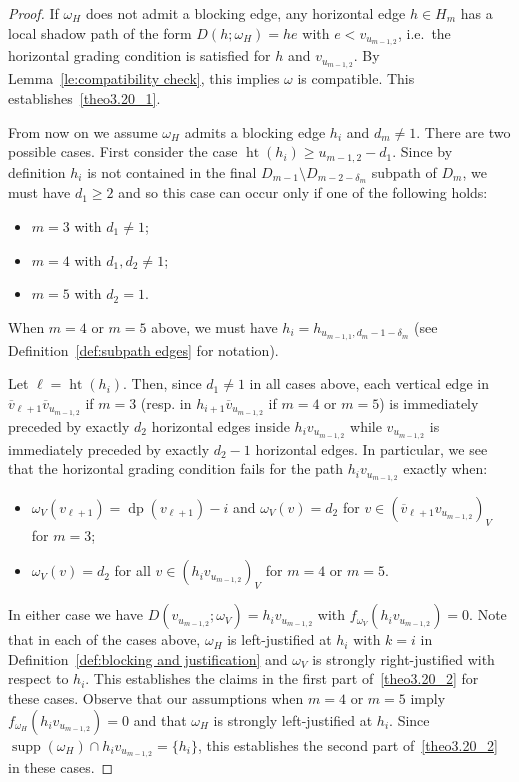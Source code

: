\documentclass[10pt]{amsart}
\theoremstyle{definition}
\newcommand{\ie}{i.e.\ }
\DeclareMathOperator{\hgt}{ht}
\DeclareMathOperator{\dpt}{dp}
\DeclareMathOperator{\supp}{supp}
\begin{document}
\begin{proof}
 If $\omega_H$ does not admit a blocking edge, any horizontal edge $h\in H_m$ has a local shadow path of the form $D(h;\omega_H)=he$ with $e<v_{u_{m-1,2}}$, \ie the horizontal grading condition is satisfied for $h$ and $v_{u_{m-1,2}}$. By Lemma~\ref{le:compatibility check}, this implies $\omega$ is compatible. 
 This establishes~\ref{theo3.20_1}. 
 
 From now on we assume $\omega_H$ admits a blocking edge $h_i$ and $d_m\ne1$. 
 There are two possible cases.
 First consider the case $\hgt(h_i)\ge u_{m-1,2}-d_1$.
 Since by definition $h_i$ is not contained in the final $D_{m-1}\setminus D_{m-2-\delta_m}$ subpath of $D_m$, we must have $d_1\ge2$ and so this case can occur only if one of the following holds:
 \begin{itemize}
 \item $m=3$ with $d_1\ne1$;
 \item $m=4$ with $d_1,d_2\ne1$;
 \item $m=5$ with $d_2=1$.
 \end{itemize}
 When $m=4$ or $m=5$ above, we must have $h_i=h_{u_{m-1,1},d_m-1-\delta_m}$ (see Definition~\ref{def:subpath edges} for notation).

 Let $\ell=\hgt(h_i)$.
 Then, since $d_1\ne1$ in all cases above, each vertical edge in $\overline{v}_{\ell+1}\overline{v}_{u_{m-1,2}}$ if $m=3$ (resp. in $h_{i+1}\overline{v}_{u_{m-1,2}}$ if $m=4$ or $m=5$) is immediately preceded by exactly $d_2$ horizontal edges inside $h_iv_{u_{m-1,2}}$ while $v_{u_{m-1,2}}$ is immediately preceded by exactly $d_2-1$ horizontal edges.
 In particular, we see that the horizontal grading condition fails for the path $h_iv_{u_{m-1,2}}$ exactly when:
 \begin{itemize}
 \item $\omega_V(v_{\ell+1})=\dpt(v_{\ell+1})-i$ and $\omega_V(v)=d_2$ for $v\in(\overline{v}_{\ell+1}v_{u_{m-1,2}})_V$ for $m=3$;
 \item $\omega_V(v)=d_2$ for all $v\in(h_iv_{u_{m-1,2}})_V$ for $m=4$ or $m=5$.
 \end{itemize}
 In either case we have $D(v_{u_{m-1,2}};\omega_V)=h_iv_{u_{m-1,2}}$ with $f_{\omega_V}(h_iv_{u_{m-1,2}})=0$.
 Note that in each of the cases above, $\omega_H$ is left-justified at $h_i$ with $k=i$ in Definition~\ref{def:blocking and justification} and $\omega_V$ is strongly right-justified with respect to $h_i$.
 This establishes the claims in the first part of~\ref{theo3.20_2} for these cases.
 Observe that our assumptions when $m=4$ or $m=5$ imply $f_{\omega_H}(h_iv_{u_{m-1,2}})=0$ and that $\omega_H$ is strongly left-justified at $h_i$.
 Since $\supp(\omega_H)\cap h_iv_{u_{m-1,2}}=\{h_i\}$, this establishes the second part of~\ref{theo3.20_2} in these cases.
 

\end{proof}
\end{document}
